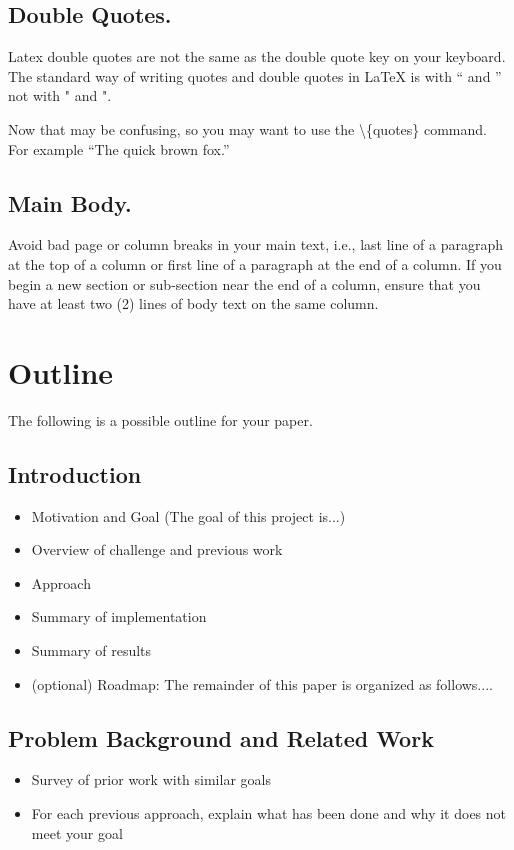 \documentclass[pageno]{jpaper}
\newcommand{\quotes}[1]{``#1''}
\begin{document}
\subsection{Double Quotes.}

Latex double quotes are not the same as the double quote key on your
keyboard. The standard way of writing quotes and double quotes in
LaTeX is with `` and '' not with " and ".   

Now that may be confusing, so you may want to use the \textbackslash\{quotes\} command.  For
example \quotes{The quick brown fox.}



\subsection{Main Body.}

Avoid bad page or column breaks in
your main text, i.e., last line of a paragraph at the top of a
column or first line of a paragraph at the end of a column. If you
begin a new section or sub-section near the end of a column,
ensure that you have at least two (2)  lines of body text on the same
column. 

\section{Outline}  
The following is a possible outline for your paper.
\subsection{Introduction}
\begin{itemize}
\item Motivation and Goal (The goal of this project is...)
\item Overview of challenge and previous work 
\item Approach 
\item Summary of implementation
\item Summary of results
\item (optional) Roadmap: The remainder of this paper is organized as follows....
\end{itemize}

\subsection{Problem Background and Related Work}
\begin{itemize}
\item Survey of prior work with similar goals 
\item For each previous approach, explain what has been done and why it does not meet your goal
\end{itemize}
\end{document}
